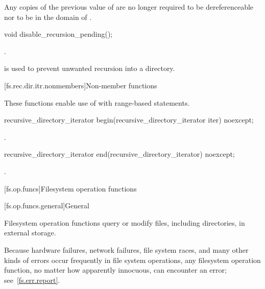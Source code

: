 \pnum
\remarks
Any copies of the previous value of 
are no longer required
to be dereferenceable nor to be in the domain of \tcode{==}.

%
\begin{itemdecl}
void disable_recursion_pending();
\end{itemdecl}

\begin{itemdescr}
\pnum
\ensures
{}.

\pnum
\begin{note}
\tcode{()} is used to prevent
  unwanted recursion into a directory.
\end{note}
\end{itemdescr}

[fs.rec.dir.itr.nonmembers]{Non-member functions}

\pnum
These functions enable use of 
with range-based  statements.

%
\begin{itemdecl}
recursive_directory_iterator begin(recursive_directory_iterator iter) noexcept;
\end{itemdecl}

\begin{itemdescr}
\pnum
\returns
{}.
\end{itemdescr}

%
\begin{itemdecl}
recursive_directory_iterator end(recursive_directory_iterator) noexcept;
\end{itemdecl}

\begin{itemdescr}
\pnum
\returns
{}.
\end{itemdescr}

[fs.op.funcs]{Filesystem operation functions}

[fs.op.funcs.general]{General}

\pnum
Filesystem operation functions query or modify files, including directories,
in external storage.

\pnum
\begin{note}
Because hardware failures, network failures, file system races,
and many other kinds of errors occur frequently in file system operations,
any filesystem operation function, no matter how apparently innocuous,
can encounter an error; see~\ref{fs.err.report}.
\end{note}

